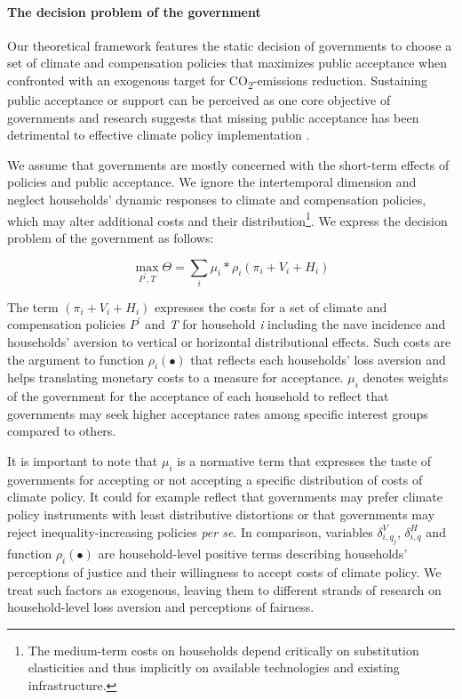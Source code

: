 \documentclass[12pt, a4paper]{article}
\begin{document}
\paragraph{The decision problem of the government}
Our theoretical framework features the static decision of governments to choose a set of climate and compensation policies that maximizes public acceptance when confronted with an exogenous target for CO\textsubscript{2}-emissions reduction. Sustaining public acceptance or support can be perceived as one core objective of governments and research suggests that missing public acceptance has been detrimental to effective climate policy implementation \autocite{Carattini.2018,Bergquist.2022,Douenne.2022}.

We assume that governments are mostly concerned with the short-term effects of policies and public acceptance. We ignore the intertemporal dimension and neglect households' dynamic responses to climate and compensation policies, which may alter additional costs and their distribution\footnote{The medium-term costs on households depend critically on substitution elasticities and thus implicitly on available technologies and existing infrastructure.}. We express the decision problem of the government as follows:  

\begin{equation} \label{eq:theta}
    \max_{P^{\prime},T} \Theta = \sum_{i} \mu_{i} * \rho_{i}(\pi_{i} + V_{i} + H_{i})
\end{equation}

The term $(\pi_{i} + V_{i} + H_{i})$ expresses the costs for a set of climate and compensation policies $P^{\prime}$ and \textit{T} for household \textit{i} including the nave incidence and households' aversion to vertical or horizontal distributional effects. Such costs are the argument to function $\rho_{i}(\bullet)$ that reflects each households' loss aversion \autocite{Tversky.1991} and helps translating monetary costs to a measure for acceptance. $\mu_{i}$ denotes weights of the government for the acceptance of each household to reflect that governments may seek higher acceptance rates among specific interest groups compared to others.

It is important to note that $\mu_{i}$ is a normative term that expresses the taste of governments for accepting or not accepting a specific distribution of costs of climate policy. It could for example reflect that governments may prefer climate policy instruments with least distributive distortions \autocite{Fischer.2019} or that governments may reject inequality-increasing policies \textit{per se}. In comparison, variables $\delta_{i,q_{j}}^{V}$, $\delta_{i,q}^{H}$ and function $\rho_{i}(\bullet)$ are household-level positive terms describing households' perceptions of justice and their willingness to accept costs of climate policy. We treat such factors as exogenous, leaving them to different strands of research on household-level loss aversion and perceptions of fairness. 
\end{document}

